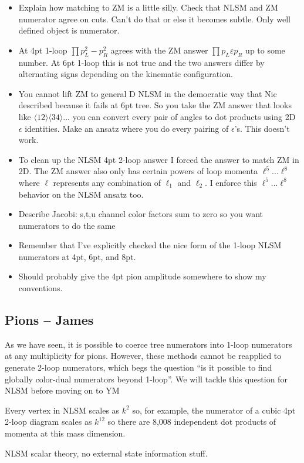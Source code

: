 \documentclass[11pt,letter]{article}
\def\eps{\varepsilon}
\begin{document}
\begin{itemize}
\item Explain how matching to ZM is a little silly.
Check that NLSM and ZM numerator agree on cuts.
Can't do that or else it becomes subtle.
Only well defined object is numerator.
\item At 4pt 1-loop $\prod p_L^2 -p_R^2$ agrees with the ZM answer $\prod p_L \eps p_R$ up to some number.
At 6pt 1-loop this is not true and the two answers differ by alternating signs depending on the kinematic configuration.
\item You cannot lift ZM to general D NLSM in the democratic way that Nic described because it fails at 6pt tree.  So you take the ZM answer that looks like $\langle 1 2\rangle \langle 3 4\rangle...$ you can convert every pair of angles to dot products using 2D $\epsilon$ identities.  Make an ansatz where you do every pairing of $\epsilon$'s.  This doesn't work.
\item To clean up the NLSM 4pt 2-loop answer I forced the answer to match ZM in 2D.
The ZM answer also only has certain powers of loop momenta $\ell^5$...$\ell^8$ where $\ell$ represents any combination of $\ell_1$ and $\ell_2$.
I enforce this $\ell^5$...$\ell^8$ behavior on the NLSM ansatz too.
\item Describe Jacobi:  s,t,u channel color factors sum to zero so you want numerators to do the same
\item Remember that I've explicitly checked the nice form of the 1-loop NLSM numerators at 4pt, 6pt, and 8pt.
\item Should probably give the 4pt pion amplitude somewhere to show my conventions.
\end{itemize}

\subsection{Pions -- James}

As we have seen, it is possible to coerce tree numerators into 1-loop numerators at any multiplicity for pions.
However, these methods cannot be reapplied to generate 2-loop numerators, which begs the question ``is it possible to find globally color-dual numerators beyond 1-loop''.
We will tackle this question for NLSM before moving on to YM

Every vertex in NLSM scales as $k^2$ so, for example, the numerator of a cubic 4pt 2-loop diagram scales as $k^{12}$ so there are 8,008 independent dot products of momenta at this mass dimension.

NLSM scalar theory, no external state information stuff.
\end{document}
